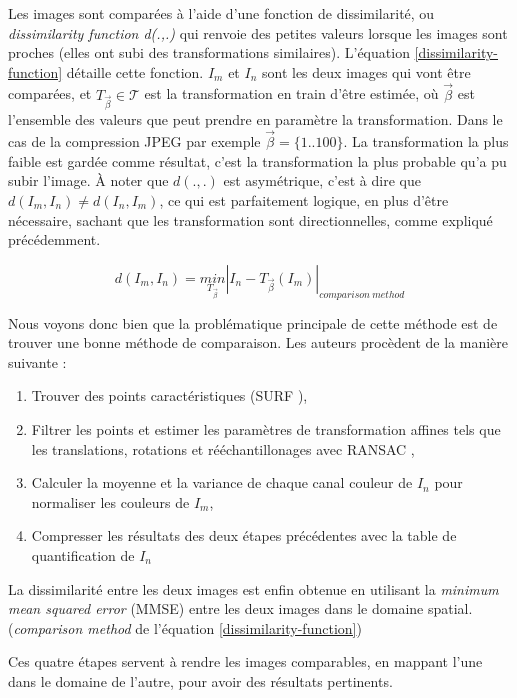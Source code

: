 \documentclass[utf8,final]{stageM2R} %
\begin{document}
Les images sont comparées à l'aide d'une fonction de dissimilarité, ou \textit{dissimilarity function d(.,.)} qui renvoie des petites valeurs lorsque les images sont proches (elles ont subi des transformations similaires). L'équation \ref{dissimilarity-function} détaille cette fonction. $I_{m}$ et $I_{n}$ sont les deux images qui vont être comparées, et $T_{\overrightarrow{\beta}} \in \mathcal{T}$ est la transformation en train d'être estimée, où $\overrightarrow{\beta}$ est l'ensemble des valeurs que peut prendre en paramètre la transformation. Dans le cas de la compression JPEG par exemple $\overrightarrow{\beta} = \{1..100\}$. La transformation la plus faible est gardée comme résultat, c'est la transformation la plus probable qu'a pu subir l'image. À noter que $d(.,.)$ est asymétrique, c'est à dire que $d(I_{m},I_{n}) \neq d(I_{n},I_{m})$, ce qui est parfaitement logique, en plus d'être nécessaire, sachant que les transformation sont directionnelles, comme expliqué précédemment.

\begin{equation}
  d(I_{m},I_{n}) = \underset{T_{\overrightarrow{\beta}}}{min}\left | I_{n} - T_{\overrightarrow{\beta}}(I_{m}) \right |_{comparison\ method}
  \label{dissimilarity-function}
\end{equation}

Nous voyons donc bien que la problématique principale de cette méthode est de trouver une bonne méthode de comparaison. Les auteurs procèdent de la manière suivante : 
\begin{enumerate}
  \item Trouver des points caractéristiques (SURF \autocite{bay2008speeded}),
  \item Filtrer les points et estimer les paramètres de transformation affines tels que les translations, rotations et rééchantillonages avec RANSAC \autocite{ransac},
  \item Calculer la moyenne et la variance de chaque canal couleur de $I_{n}$ pour normaliser les couleurs de $I_{m}$,
  \item Compresser les résultats des deux étapes précédentes avec la table de quantification de $I_{n}$
\end{enumerate}

La dissimilarité entre les deux images est enfin obtenue en utilisant la \textit{minimum mean squared error} (MMSE) entre les deux images dans le domaine spatial. (\textit{comparison method} de l'équation \ref{dissimilarity-function})

Ces quatre étapes servent à rendre les images comparables, en mappant l'une dans le domaine de l'autre, pour avoir des résultats pertinents.
\end{document}
